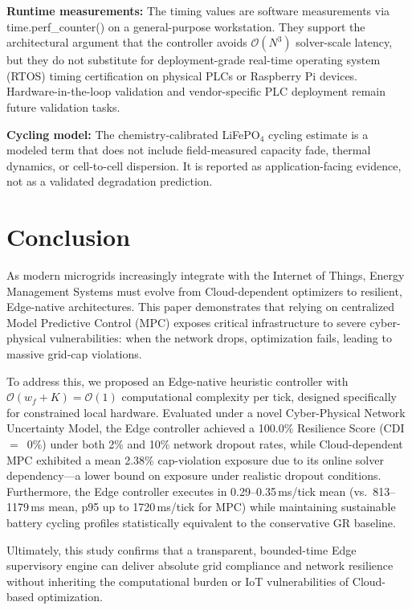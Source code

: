 \documentclass[preprint,12pt]{elsarticle}
\def\texttt#1{#1}%
\begin{document}
\textbf{Runtime measurements:} The timing values are software measurements via \texttt{time.perf\_counter()} on a general-purpose workstation. They support the architectural argument that the controller avoids $\mathcal{O}(N^3)$ solver-scale latency, but they do not substitute for deployment-grade real-time operating system (RTOS) timing certification on physical PLCs or Raspberry Pi devices. Hardware-in-the-loop validation and vendor-specific PLC deployment remain future validation tasks.

\textbf{Cycling model:} The chemistry-calibrated LiFePO$_4$ cycling estimate is a modeled term that does not include field-measured capacity fade, thermal dynamics, or cell-to-cell dispersion. It is reported as application-facing evidence, not as a validated degradation prediction.


\FloatBarrier
\section{Conclusion} \label{sec:conclusion}
As modern microgrids increasingly integrate with the Internet of Things, Energy Management Systems must evolve from Cloud-dependent optimizers to resilient, Edge-native architectures. This paper demonstrates that relying on centralized Model Predictive Control (MPC) exposes critical infrastructure to severe cyber-physical vulnerabilities: when the network drops, optimization fails, leading to massive grid-cap violations.

To address this, we proposed an Edge-native heuristic controller with $\mathcal{O}(w_f{+}K)=\mathcal{O}(1)$ computational complexity per tick, designed specifically for constrained local hardware. Evaluated under a novel Cyber-Physical Network Uncertainty Model, the Edge controller achieved a 100.0\% Resilience Score (CDI~$=$~0\%) under both 2\% and 10\% network dropout rates, while Cloud-dependent MPC exhibited a mean 2.38\% cap-violation exposure due to its online solver dependency---a lower bound on exposure under realistic dropout conditions. Furthermore, the Edge controller executes in 0.29--0.35\,ms/tick mean (vs.\ 813--1179\,ms mean, p95 up to 1720\,ms/tick for MPC) while maintaining sustainable battery cycling profiles statistically equivalent to the conservative GR baseline. 

Ultimately, this study confirms that a transparent, bounded-time Edge supervisory engine can deliver absolute grid compliance and network resilience without inheriting the computational burden or IoT vulnerabilities of Cloud-based optimization.
\end{document}
